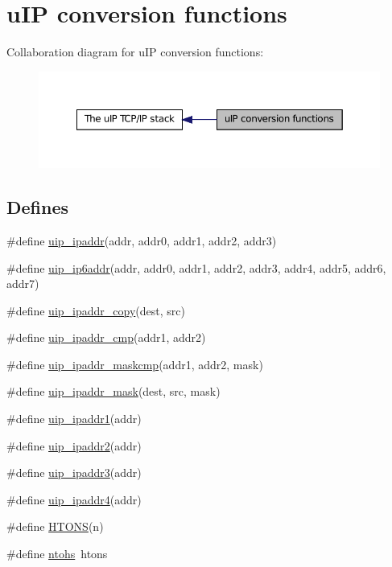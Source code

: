 \hypertarget{group__uipconvfunc}{
\section{uIP conversion functions}
\label{group__uipconvfunc}
}


Collaboration diagram for uIP conversion functions:
\nopagebreak
\begin{figure}[H]
\begin{center}
\leavevmode
\includegraphics[width=360pt]{group__uipconvfunc}
\end{center}
\end{figure}


\subsection*{Defines}
\begin{DoxyCompactItemize}
\item 
\#define \hyperlink{group__uipconvfunc_ga87f0b54ade0d159fba495089128a4932}{uip\_\-ipaddr}(addr, addr0, addr1, addr2, addr3)
\item 
\#define \hyperlink{group__uipconvfunc_ga53fbda0e8c31d4882294c8dc3cb5f487}{uip\_\-ip6addr}(addr, addr0, addr1, addr2, addr3, addr4, addr5, addr6, addr7)
\item 
\#define \hyperlink{group__uipconvfunc_ga769512993b7b27271909d6daa4748b60}{uip\_\-ipaddr\_\-copy}(dest, src)
\item 
\#define \hyperlink{group__uipconvfunc_ga210e629f7252e4bc8458cbdf260b3318}{uip\_\-ipaddr\_\-cmp}(addr1, addr2)
\item 
\#define \hyperlink{group__uipconvfunc_ga6b16e0bac41821c1fbe0c267071642f0}{uip\_\-ipaddr\_\-maskcmp}(addr1, addr2, mask)
\item 
\#define \hyperlink{group__uipconvfunc_ga969d7fff37a979737da045e0d538a9bd}{uip\_\-ipaddr\_\-mask}(dest, src, mask)
\item 
\#define \hyperlink{group__uipconvfunc_ga22fa0681cd463191d7a01fe85d86996f}{uip\_\-ipaddr1}(addr)
\item 
\#define \hyperlink{group__uipconvfunc_gaffcd2fbe181e2aaefbf970551c302af5}{uip\_\-ipaddr2}(addr)
\item 
\#define \hyperlink{group__uipconvfunc_gae23534479ead15af8ff08ace26a47fb5}{uip\_\-ipaddr3}(addr)
\item 
\#define \hyperlink{group__uipconvfunc_ga165b603ec150e26efec7be199c9c2901}{uip\_\-ipaddr4}(addr)
\item 
\#define \hyperlink{group__uipconvfunc_ga69a7a4951ff21b302267532c21ee78fc}{HTONS}(n)
\item 
\#define \hyperlink{group__uipconvfunc_ga118e9d76568ab81ad97f138d4ea1ddd2}{ntohs}~htons
\end{DoxyCompactItemize}
